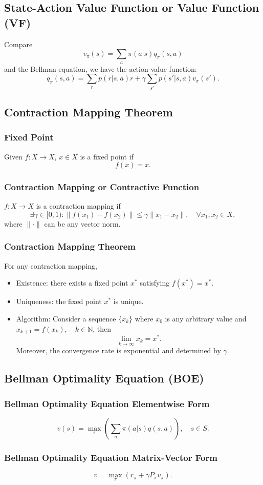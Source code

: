 \documentclass[a4paper,12pt]{report}
\begin{document}
\subsection{State-Action Value Function or Value Function (VF)}
Compare
\[v_{\pi}(s)=\sum_a\pi(a|s)q_{\pi}(s,a)\]
and the Bellman equation, we have the action-value function:
\[q_{\pi}(s,a)=\sum_rp(r|s,a)r+\gamma\sum_{s'}p(s'|s,a)v_{\pi}(s').\]
\subsection{Contraction Mapping Theorem}
\subsubsection{Fixed Point}
Given $f\colon X\to X$, $x\in X$ is a fixed point if
\[f(x)=x.\]
\subsubsection{Contraction Mapping or Contractive Function}
$f\colon X\to X$ is a contraction mapping if
\[\exists\gamma\in[0,1)\colon\|f(x_1)-f(x_2)\|\leq\gamma\|x_1-x_2\|,\quad\forall x_1,x_2\in X,\]
where $\|\cdot\|$ can be any vector norm.
\subsubsection{Contraction Mapping Theorem}
For any contraction mapping,
\begin{itemize}
\item Existence: there exists a fixed point $x^*$ satisfying $f(x^*)=x^*$.
\item Uniqueness: the fixed point $x^*$ is unique.
\item Algorithm: Consider a sequence $\{x_k\}$ where $x_0$ is any arbitrary value and $x_{k+1}=f(x_k),\quad k\in\mathbb{N}$, then
\[\lim_{k\to\infty}x_k=x^*.\]
Moreover, the convergence rate is exponential and determined by $\gamma$.
\end{itemize}
\subsection{Bellman Optimality Equation (BOE)}
\subsubsection{Bellman Optimality Equation Elementwise Form}
\[v(s)=\max_{\pi}\left(\sum_a\pi(a|s)q(s,a)\right),\quad s\in S.\]
\subsubsection{Bellman Optimality Equation Matrix-Vector Form}
\[v=\max_{\pi}\left(r_{\pi}+\gamma P_{\pi}v_{\pi}\right).\]
\end{document}
